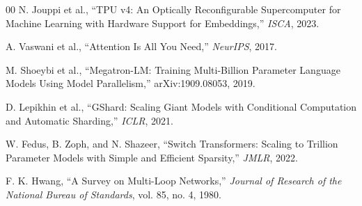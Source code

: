 \documentclass[conference]{IEEEtran}
\begin{document}
\begin{thebibliography}{00}
N. Jouppi et al., ``TPU v4: An Optically Reconfigurable Supercomputer for
Machine Learning with Hardware Support for Embeddings,'' \emph{ISCA}, 2023.

A. Vaswani et al., ``Attention Is All You Need,'' \emph{NeurIPS}, 2017.

M. Shoeybi et al., ``Megatron-LM: Training Multi-Billion Parameter Language
Models Using Model Parallelism,'' arXiv:1909.08053, 2019.

D. Lepikhin et al., ``GShard: Scaling Giant Models with Conditional
Computation and Automatic Sharding,'' \emph{ICLR}, 2021.

W. Fedus, B. Zoph, and N. Shazeer, ``Switch Transformers: Scaling to Trillion
Parameter Models with Simple and Efficient Sparsity,'' \emph{JMLR}, 2022.

F. K. Hwang, ``A Survey on Multi-Loop Networks,'' \emph{Journal of Research of
the National Bureau of Standards}, vol. 85, no. 4, 1980.
\end{thebibliography}

\clearpage
\onecolumn
{}
  {}
  {}
\end{document}
